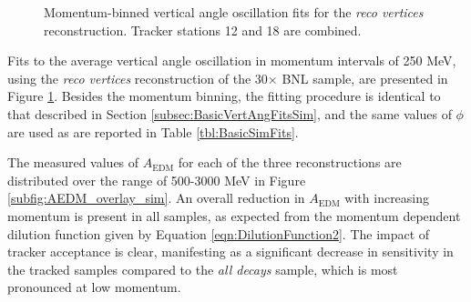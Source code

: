 \begin{figure}[]
\hfill
{}
\caption{Momentum-binned vertical angle oscillation fits for the \textit{reco vertices} reconstruction. Tracker stations 12 and 18 are combined.}
\label{fig:TrackRecoMomBinnedFits}
\end{figure}

Fits to the average vertical angle oscillation in momentum intervals of 250 MeV, using the \textit{reco vertices} reconstruction of the 30$\times$ BNL sample, are presented in Figure \ref{fig:TrackRecoMomBinnedFits}. Besides the momentum binning, the fitting procedure is identical to that described in Section \ref{subsec:BasicVertAngFitsSim}, and the same values of $\phi$ are used as are reported in Table \ref{tbl:BasicSimFits}.

The measured values of $A_{\text{EDM}}$ for each of the three reconstructions are distributed over the range of 500-3000 MeV in Figure \ref{subfig:AEDM_overlay_sim}. An overall reduction in $A_{\text{EDM}}$ with increasing momentum is present in all samples, as expected from the momentum dependent dilution function given by Equation \ref{eqn:DilutionFunction2}. The impact of tracker acceptance is clear, manifesting as a significant decrease in sensitivity in the tracked samples compared to the \textit{all decays} sample, which is most pronounced at low momentum. 


